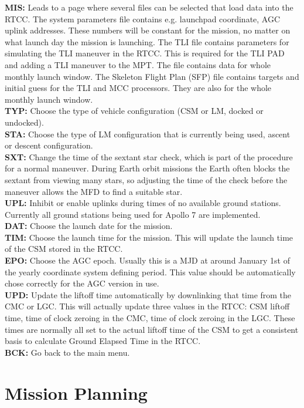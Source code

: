 \documentclass[11pt]{article} %
\begin{document}
\textbf{MIS:} Leads to a page where several files can be selected that load data into the RTCC. The system parameters file contains e.g. launchpad coordinate, AGC uplink addresses. These numbers will be constant for the mission, no matter on what launch day the mission is launching. The TLI file contains parameters for simulating the TLI maneuver in the RTCC. This is required for the TLI PAD and adding a TLI maneuver to the MPT. The file contains data for whole monthly launch window. The Skeleton Flight Plan (SFP) file contains targets and initial guess for the TLI and MCC processors. They are also for the whole monthly launch window.\\
\textbf{TYP:} Choose the type of vehicle configuration (CSM or LM, docked or undocked).\\
\textbf{STA:} Choose the type of LM configuration that is currently being used, ascent or descent configuration.\\
\textbf{SXT:} Change the time of the sextant star check, which is part of the procedure for a normal maneuver. During Earth orbit missions the Earth often blocks the sextant from viewing many stars, so adjusting the time of the check before the maneuver allows the MFD to find a suitable star.\\
\textbf{UPL:} Inhibit or enable uplinks during times of no available ground stations. Currently all ground stations being used for Apollo 7 are implemented.\\
\textbf{DAT:} Choose the launch date for the mission.\\
\textbf{TIM:} Choose the launch time for the mission. This will update the launch time of the CSM stored in the RTCC.\\
\textbf{EPO:} Choose the AGC epoch. Usually this is a MJD at around January 1st of the yearly coordinate system defining period. This value should be automatically chose correctly for the AGC version in use.\\
\textbf{UPD:} Update the liftoff time automatically by downlinking that time from the CMC or LGC. This will actually update three values in the RTCC: CSM liftoff time, time of clock zeroing in the CMC, time of clock zeroing in the LGC. These times are normally all set to the actual liftoff time of the CSM to get a consistent basis to calculate Ground Elapsed Time in the RTCC.\\
\textbf{BCK:} Go back to the main menu.\\
\newpage
\section{Mission Planning}
\end{document}
